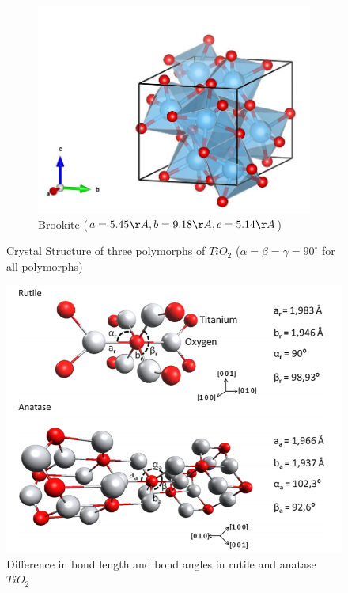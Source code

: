 \documentclass[main.tex]{subfiles}
\begin{document}
\begin{figure}[!htb]
	\begin{subfigure}[h]{0.6\textwidth}
  		\centering
  		\includegraphics[width=\linewidth]{brookite}
  		\caption{Brookite ($a=5.45 \AA, b=9.18 \AA, c=5.14 \AA$)}
	\end{subfigure}
\caption{Crystal Structure of three polymorphs of $TiO_{2}$ ($\alpha=\beta=\gamma=90^{\circ}$ for all polymorphs)} 
\label{fig:fig}

\end{figure}
\FloatBarrier

\begin{figure}[!htb]
	\centering
	\includegraphics[width=0.6\linewidth]{bond_tio2}
	\caption{Difference in bond length and bond angles in rutile and anatase $TiO_{2}$}
	\label{fig:TEM_PT}
\end{figure}
\FloatBarrier
\end{document}
